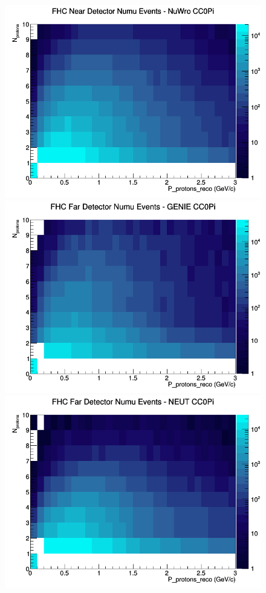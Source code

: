 \begin{figure}[h]
\includegraphics[width=\linewidth]{eff_N_P/GAr/protons/CC0Pi_FHC_ND_numu_N_P_NuWro.png}
\endminipage
\newline
{}
\includegraphics[width=\linewidth]{eff_N_P/GAr/protons/CC0Pi_FHC_FD_numu_N_P_GENIE.png}
\endminipage
{}
\includegraphics[width=\linewidth]{eff_N_P/GAr/protons/CC0Pi_FHC_FD_numu_N_P_NEUT.png}

\end{figure}
